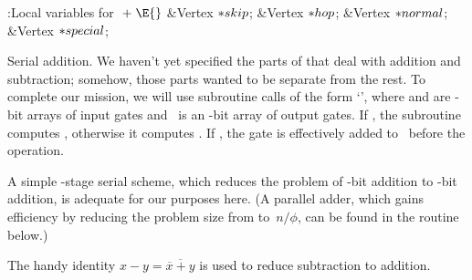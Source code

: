 \B{}:Local variables for \X${}\mathrel+\E{}$\6
\&{Vertex} ${}{*}\\{skip}{}$;\6
\&{Vertex} ${}{*}\\{hop}{}$;\6
\&{Vertex} ${}{*}\\{normal}{}$;\6
\&{Vertex} ${}{*}\\{special}{}$;\par
\fi

Serial addition. We haven't yet specified the parts of 
that
deal with addition and subtraction; somehow, those parts wanted to
be separate from the rest. To complete our mission, we will use
subroutine calls of the form `',
where  and  are -bit arrays of input gates and
~is an -bit array of output gates. If , the subroutine
computes , otherwise it computes . If , the  gate
is effectively added to~ before the operation.

A simple -stage serial scheme, which reduces the problem of -bit
addition to -bit addition, is adequate for our purposes here.
(A parallel adder, which gains efficiency by reducing the problem size
from  to~$n/\phi$, can be found in the  routine below.)

The handy identity $x-y=\overline{\overline x+y}$ is used to reduce
subtraction to addition.

